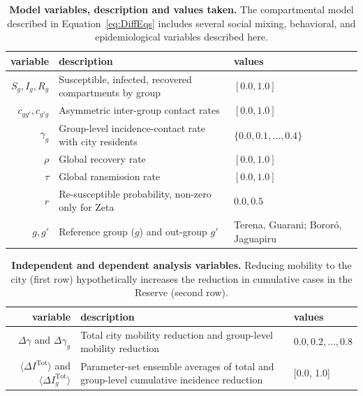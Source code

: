 \documentclass[
  letterpaper,
  abstract]{scrartcl}
\begin{document}
\begin{table}[h]
  \centering
  \caption{\textbf{Model variables, description and values taken.} The
  compartmental model described in Equation~\ref{eq:DiffEqs} includes several
social mixing, behavioral, and epidemiological variables described here.}
  \label{tab:ModelVariables}
  \begin{tabular}{rlp{1.3in}} 
    \toprule
    variable & description & values \\ 
    \midrule 
    $S_g,I_g,R_g$ & Susceptible, infected, recovered compartments by group & $[0.0,1.0]$ \\
    $c_{gg'},c_{g'g}$ & Asymmetric inter-group contact rates & $[0.0,1.0]$ \\
    $\gamma_g$ & Group-level incidence-contact rate with city residents &
      $\{0.0,0.1,\ldots,0.4\}$ \\
    $\rho$ & Global recovery rate & $[0.0,1.0]$ \\
    $\tau$ & Global ransmission rate & $[0.0,1.0]$ \\
    $r$    & Re-susceptible probability, non-zero only for Zeta & $0.0,0.5$ \\
    $g,g'$ & Reference group ($g$) and out-group $g'$ & Terena, Guarani; Bororó, Jaguapiru \\
    \bottomrule
  \end{tabular} 
\end{table}



\begin{table}[h]
  \centering
  \caption{\textbf{Independent and dependent analysis variables.} Reducing
  mobility to the city (first row) hypothetically increases the reduction in
cumulative cases in the Reserve (second row).}
  \label{tab:AnalysisVariables}
  \begin{tabular}{rp{3.0in}l} 
    \toprule
    variable & description & values \\
    \midrule 
    $\Delta \gamma$ and $\Delta \gamma_g$ & Total city mobility reduction and 
      group-level mobility reduction & $0.0,0.2,\ldots,0.8$ \\
      $\langle \Delta I^\mathrm{Tot} \rangle$ and $\langle \Delta I^\mathrm{Tot}_g
      \rangle$  & Parameter-set ensemble averages of total and group-level
      cumulative incidence reduction & [0.0, 1.0] \\
    \bottomrule
  \end{tabular} 
\end{table}
\end{document}
